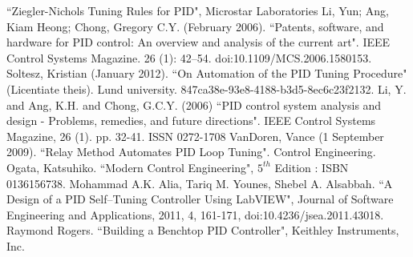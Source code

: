 \begin{thebibliography}{99}
 ``Ziegler-Nichols Tuning Rules for PID", Microstar Laboratories
 Li, Yun; Ang, Kiam Heong; Chong, Gregory C.Y. (February 2006). ``Patents, software, and hardware for PID control: An overview and analysis of the current art". IEEE Control Systems Magazine. 26 (1): 42–54. doi:10.1109/MCS.2006.1580153.
 Soltesz, Kristian (January 2012). ``On Automation of the PID Tuning Procedure" (Licentiate theis). Lund university. 847ca38e-93e8-4188-b3d5-8ec6c23f2132.
 Li, Y. and Ang, K.H. and Chong, G.C.Y. (2006) ``PID control system analysis and design - Problems, remedies, and future directions". IEEE Control Systems Magazine, 26 (1). pp. 32-41. ISSN 0272-1708
 VanDoren, Vance (1 September 2009). ``Relay Method Automates PID Loop Tuning". Control Engineering.
 Ogata, Katsuhiko. ``Modern Control Engineering", $5^{th}$ Edition : ISBN 0136156738.
 Mohammad A.K. Alia, Tariq M. Younes, Shebel A. Alsabbah. ``A Design of a PID Self--Tuning Controller Using LabVIEW", Journal of Software Engineering and Applications, 2011, 4, 161-171, doi:10.4236/jsea.2011.43018.
 Raymond Rogers. ``Building a Benchtop PID Controller", Keithley Instruments, Inc.








\end{thebibliography}

